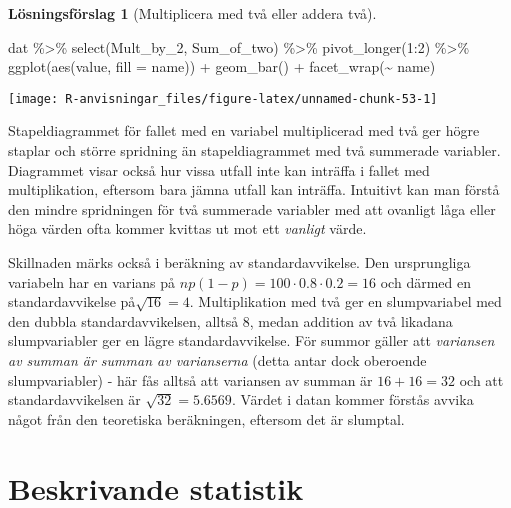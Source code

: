 \documentclass[
]{book}
\newenvironment{Shaded}{\begin{snugshade}}{\end{snugshade}}
\newcommand{\AttributeTok}[1]{\textcolor[rgb]{0.77,0.63,0.00}{#1}}
\newcommand{\DecValTok}[1]{\textcolor[rgb]{0.00,0.00,0.81}{#1}}
\newcommand{\FunctionTok}[1]{\textcolor[rgb]{0.00,0.00,0.00}{#1}}
\newcommand{\NormalTok}[1]{#1}
\newcommand{\SpecialCharTok}[1]{\textcolor[rgb]{0.00,0.00,0.00}{#1}}
\theoremstyle{definition}
\theoremstyle{definition}
\theoremstyle{definition}
\theoremstyle{definition}
\newtheorem{hypothesis}{Lösningsförslag}[chapter]
\theoremstyle{remark}
\begin{document}
\begin{hypothesis}[Multiplicera med två eller addera två]
\begin{Shaded}
\begin{Highlighting}[]
\NormalTok{dat }\SpecialCharTok{\%\textgreater{}\%} 
  \FunctionTok{select}\NormalTok{(Mult\_by\_2, Sum\_of\_two) }\SpecialCharTok{\%\textgreater{}\%} 
  \FunctionTok{pivot\_longer}\NormalTok{(}\DecValTok{1}\SpecialCharTok{:}\DecValTok{2}\NormalTok{) }\SpecialCharTok{\%\textgreater{}\%} 
  \FunctionTok{ggplot}\NormalTok{(}\FunctionTok{aes}\NormalTok{(value, }\AttributeTok{fill =}\NormalTok{ name)) }\SpecialCharTok{+}
  \FunctionTok{geom\_bar}\NormalTok{() }\SpecialCharTok{+}
  \FunctionTok{facet\_wrap}\NormalTok{(}\SpecialCharTok{\textasciitilde{}}\NormalTok{ name)}
\end{Highlighting}
\end{Shaded}

\begin{center}\texttt{[image: R-anvisningar\_files/figure-latex/unnamed-chunk-53-1]} \end{center}

Stapeldiagrammet för fallet med en variabel multiplicerad med två ger högre staplar och större spridning än stapeldiagrammet med två summerade variabler. Diagrammet visar också hur vissa utfall inte kan inträffa i fallet med multiplikation, eftersom bara jämna utfall kan inträffa. Intuitivt kan man förstå den mindre spridningen för två summerade variabler med att ovanligt låga eller höga värden ofta kommer kvittas ut mot ett \emph{vanligt} värde.

Skillnaden märks också i beräkning av standardavvikelse. Den ursprungliga variabeln har en varians på \(np(1-p) = 100 \cdot 0.8 \cdot 0.2 = 16\) och därmed en standardavvikelse på\(\sqrt{16} = 4\). Multiplikation med två ger en slumpvariabel med den dubbla standardavvikelsen, alltså 8, medan addition av två likadana slumpvariabler ger en lägre standardavvikelse. För summor gäller att \emph{variansen av summan är summan av varianserna} (detta antar dock oberoende slumpvariabler) - här fås alltså att variansen av summan är \(16+16=32\) och att standardavvikelsen är \(\sqrt{32} = 5.6569\). Värdet i datan kommer förstås avvika något från den teoretiska beräkningen, eftersom det är slumptal.
\end{hypothesis}

\hypertarget{beskrivande-statistik}{%
\chapter{Beskrivande statistik}\label{beskrivande-statistik}}
\end{document}
